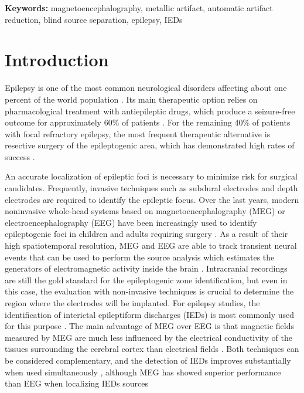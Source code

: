 \textbf{Keywords:} magnetoencephalography, metallic artifact, automatic artifact reduction, blind source separation, epilepsy, IEDs

\section{Introduction}

Epilepsy is one of the most common neurological disorders affecting about one percent of the world population \citep{Ramey2013}. Its main therapeutic option relies on pharmacological treatment with antiepileptic drugs, which produce a seizure-free outcome for approximately 60\% of patients \citep{Schuele2008}. For the remaining 40\% of patients with focal refractory epilepsy, the most frequent therapeutic alternative is resective surgery of the epileptogenic area, which has demonstrated high rates of success \citep{Ramey2013}. 

An accurate localization of epileptic foci is necessary to minimize risk for surgical candidates. Frequently, invasive techniques such as subdural electrodes and depth electrodes are required to identify the epileptic focus. Over the last years, modern noninvasive whole-head systems based on magnetoencephalography (MEG) or electroencephalography (EEG) have been increasingly used to identify epileptogenic foci in children and adults requiring surgery \citep{Stufflebeam2009}. As a result of their high spatiotemporal resolution, MEG and EEG are able to track transient neural events that can be used to perform the source analysis which estimates the generators of electromagnetic activity inside the brain \citep{Gross2013}. Intracranial recordings are still the gold standard \citet{Panzica2013} for the epileptogenic zone identification, but even in this case, the evaluation with non-invasive techniques is crucial to determine the region where the electrodes will be implanted. For epilepsy studies, the identification of interictal epileptiform discharges (IEDs) is most commonly used for this purpose \citep{Bagic2011,Bouet2012}. The main advantage of MEG over EEG is that magnetic fields measured by MEG are much less influenced by the electrical conductivity of the tissues surrounding the cerebral cortex than electrical fields \citep{Shibasaki2007}. Both techniques can be considered complementary, and the detection of IEDs improves substantially when used simultaneously \citep{Lin2003,Pataraia2005,Knake2006}, although MEG has showed superior performance than EEG when localizing IEDs sources \citep{Amo2003,Stefan2004,Ramantani2006}

